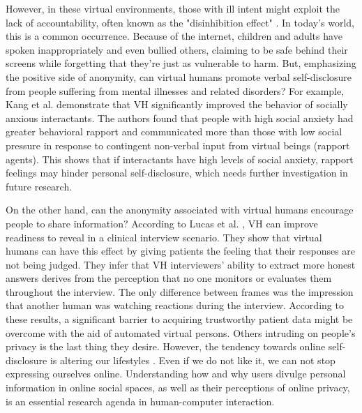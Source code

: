 However, in these virtual environments, those with ill intent might exploit the lack of accountability, often known as the "disinhibition effect" \cite{WAN20, KUR18}. In today's world, this is a common occurrence. Because of the internet, children and adults have spoken inappropriately and even bullied others, claiming to be safe behind their screens while forgetting that they're just as vulnerable to harm. But, emphasizing the positive side of anonymity, can virtual humans promote verbal self-disclosure from people suffering from mental illnesses and related
disorders? For example, Kang et al. \cite{KAN10} demonstrate that VH significantly improved the behavior of socially anxious interactants. The authors found that people with high social anxiety had greater behavioral rapport and communicated more than those with low social pressure in response to contingent non-verbal input from virtual beings (rapport agents). This shows that if interactants have high levels of social anxiety, rapport feelings may hinder personal self-disclosure, which needs further investigation in future research.

On the other hand, can the anonymity associated with virtual humans encourage people to share information? According to Lucas et al. \cite{LUC14}, VH can improve readiness to reveal in a clinical interview scenario. They show that virtual humans can have this effect by giving patients the feeling that their responses are not being judged. They infer that VH interviewers' ability to extract more honest answers derives from the perception that no one monitors or evaluates them throughout the interview. The only difference between frames was the impression that another human was watching reactions during the interview. According to these results, a significant barrier to acquiring trustworthy patient data might be overcome with the aid of automated virtual persons. Others intruding on people's privacy is the last thing they desire. However, the tendency towards online self-disclosure is altering our lifestyles \cite{ELE14}. Even if we do not like it, we can not stop expressing ourselves online. Understanding how and why users divulge personal information in online social spaces, as well as their perceptions of online privacy, is an essential research agenda in human-computer interaction. 

